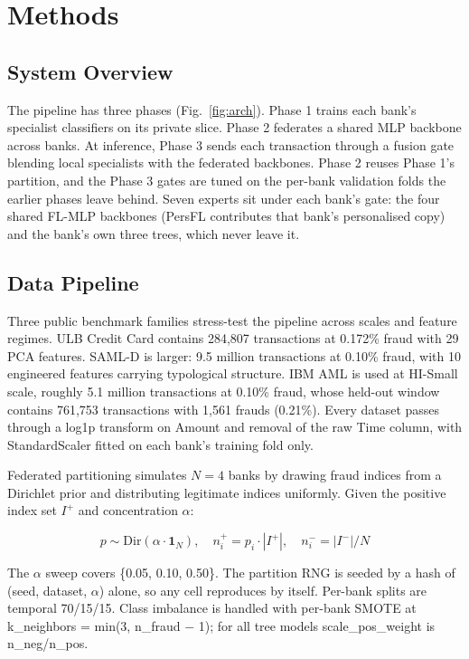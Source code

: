 \documentclass[a4paper, 10pt, conference]{ieeeconf}
\begin{document}
\section{Methods}

\subsection{System Overview}
The pipeline has three phases (Fig.~\ref{fig:arch}). Phase 1 trains each bank's
specialist classifiers on its private slice. Phase 2 federates a shared MLP
backbone across banks. At inference, Phase 3 sends each transaction through a
fusion gate blending local specialists with the federated backbones. Phase 2
reuses Phase 1's partition, and the Phase 3 gates are tuned on the per-bank
validation folds the earlier phases leave behind. Seven experts sit under each
bank's gate: the four shared FL-MLP backbones (PersFL contributes that bank's
personalised copy) and the bank's own three trees, which never leave it.

\subsection{Data Pipeline}
Three public benchmark families stress-test the pipeline across scales and
feature regimes. ULB Credit Card \cite{r20} contains 284,807 transactions at
0.172\% fraud with 29 PCA features. SAML-D \cite{r2} is larger: 9.5 million
transactions at 0.10\% fraud, with 10 engineered features carrying typological
structure. IBM AML \cite{r21} is used at HI-Small scale, roughly 5.1 million
transactions at 0.10\% fraud, whose held-out window contains 761,753
transactions with 1,561 frauds (0.21\%). Every dataset passes through a log1p
transform on Amount and removal of the raw Time column, with StandardScaler
fitted on each bank's training fold only.

Federated partitioning simulates $N = 4$ banks by drawing fraud indices from a
Dirichlet prior and distributing legitimate indices uniformly. Given the
positive index set $I^{+}$ and concentration $\alpha$:

\begin{equation}
p \sim \mathrm{Dir}(\alpha \cdot \mathbf{1}_{N}), \quad n_i^{+} = p_i \cdot |I^{+}|, \quad n_i^{-} = |I^{-}|/N
\end{equation}

The $\alpha$ sweep covers \{0.05, 0.10, 0.50\}. The partition RNG is seeded by a
hash of (seed, dataset, $\alpha$) alone, so any cell reproduces by itself.
Per-bank splits are temporal 70/15/15. Class imbalance is handled with per-bank
SMOTE \cite{r22} at k\_neighbors = min(3, n\_fraud $-$ 1); for all tree models
scale\_pos\_weight is n\_neg/n\_pos.
\end{document}
